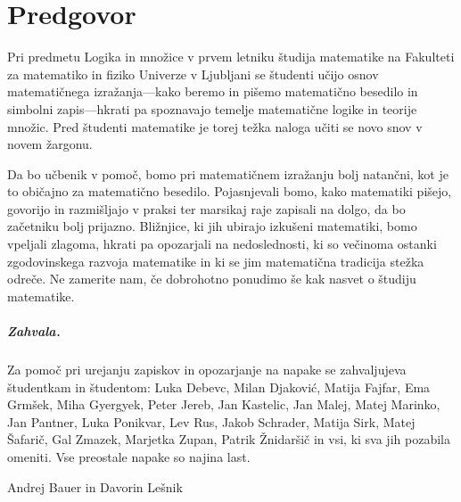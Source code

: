 \chapter*{Predgovor}

Pri predmetu Logika in množice v prvem letniku študija matematike na Fakulteti za matematiko in fiziko Univerze v Ljubljani se študenti učijo osnov matematičnega izražanja---kako beremo in pišemo matematično besedilo in simbolni zapis---hkrati pa spoznavajo temelje matematične logike in teorije množic.
%
Pred študenti matematike je torej težka naloga učiti se novo snov v novem žargonu.

Da bo učbenik v pomoč, bomo pri matematičnem izražanju bolj natančni, kot je to običajno za matematično besedilo.
Pojasnjevali bomo, kako matematiki pišejo, govorijo in razmišljajo v praksi ter marsikaj raje zapisali na dolgo, da bo začetniku bolj prijazno.
%
Bližnjice, ki jih ubirajo izkušeni matematiki, bomo vpeljali zlagoma, hkrati pa opozarjali na nedoslednosti, ki so
večinoma ostanki zgodovinskega razvoja matematike in ki se jim matematična tradicija stežka odreče.
%
Ne zamerite nam, če dobrohotno ponudimo še kak nasvet o študiju matematike.


\paragraph{Zahvala.}
%
Za pomoč pri urejanju zapiskov in opozarjanje na napake se zahvaljujeva študentkam in študentom:
%
Luka Debevc,
Milan Djaković,
Matija Fajfar,
Ema Grmšek,
Miha Gyergyek,
Peter Jereb,
Jan Kastelic,
Jan Malej,
Matej Marinko,
Jan Pantner,
Luka Ponikvar,
Lev Rus,
Jakob Schrader,
Matija Sirk,
Matej Šafarič,
Gal Zmazek,
Marjetka Zupan,
Patrik Žnidaršič
in vsi, ki sva jih pozabila omeniti.
%
Vse preostale napake so najina last.
\bigskip

\begin{flushright}
Andrej Bauer in Davorin Lešnik
\end{flushright}

\bigskip



